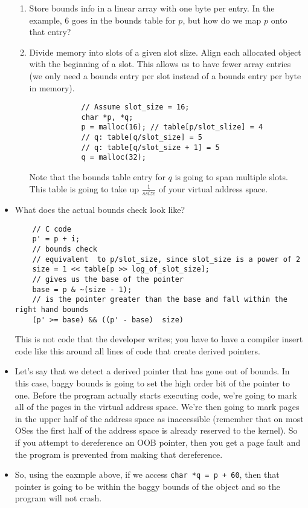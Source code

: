 \documentclass[12pt]{article}
\theoremstyle{definition}
\begin{document}
\begin{itemize}
\begin{enumerate}
        \item Store bounds info in a linear array with one byte per entry. In the example, 6 goes in the bounds table for $p$, but how do we map $p$ onto that entry?
        \item Divide memory into slots of a given slot slize. Align each allocated object with the beginning of a slot. This allows us to have fewer array entries (we only need a bounds entry per slot instead of a bounds entry per byte in memory).
        \begin{lstlisting}
            // Assume slot_size = 16;
            char *p, *q; 
            p = malloc(16); // table[p/slot_slize] = 4
            // q: table[q/slot_size] = 5
            // q: table[q/slot_size + 1] = 5
            q = malloc(32); 
        \end{lstlisting}
        Note that the bounds table entry for $q$ is going to span multiple slots. This table is going to take up $\frac{1}{ssize}$ of your virtual address space.
    \end{enumerate}
    \item What does the actual bounds check look like?
    \begin{lstlisting}
    // C code
    p' = p + i;
    // bounds check
    // equivalent  to p/slot_size, since slot_size is a power of 2
    size = 1 << table[p >> log_of_slot_size];
    // gives us the base of the pointer
    base = p & ~(size - 1);
    // is the pointer greater than the base and fall within the right hand bounds
    (p' >= base) && ((p' - base)  size)
    \end{lstlisting}
    This is not code that the developer writes; you have to have a compiler insert code like this around all lines of code that create derived pointers.
    \item Let's say that we detect a derived pointer that has gone out of bounds. In this case, baggy bounds is going to set the high order bit of the pointer to one. Before the program actually starts executing code, we're going to mark all of the pages in the virtual address space. We're then going to mark pages in the upper half of the address space as inaccessible (remember that on most OSes the first half of the address space is already reserved to the kernel). So if you attempt to dereference an OOB pointer, then you get a page fault and the program is prevented from making that dereference.
    \item So, using the eaxmple above, if we access \texttt{char *q = p + 60}, then that pointer is going to be within the baggy bounds of the object and so the program will not crash.

\end{itemize}
\end{document}
